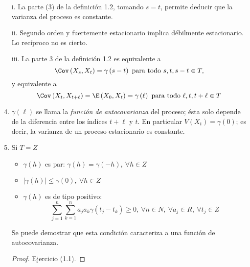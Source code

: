 \begin{observacion}
\quad
\begin{enumerate}
\item[i.] La parte (3) de la definici\'{o}n 1.2, tomando $s=t$, permite deducir que la varianza del proceso es constante.
\item[ii.] Segundo orden y fuertemente estacionario implica d\'{e}bilmente estacionario. Lo rec\'{i}proco no es cierto.
\item[iii.] La parte 3 de la definici\'{o}n 1.2 es equivalente a
\[ 
\Cov\left( X_{s},X_{t} \right)=\gamma \left( s-t \right)\text{ para todo } s,t,s-t\in T,
\]
y equivalente a
\[
\Cov\left( X_{t}, X_{t+\ell} \right)=\E\left( X_{0}, X_{t} \right)=\gamma \left(\ell \right)\text{ para todo }  \ell, t, t+\ell \in T
\]

\item $\gamma \left( \ell \right)$ se llama la \emph{funci\'{o}n de autocovarianza} del proceso; \'{e}sta solo depende de la diferencia entre los \'{i}ndices $t+\ell$ y $t$. En particular $V\left( X_{t} \right)=\gamma (0)$; es decir, la varianza de un proceso estacionario es constante.

\item Si $T=Z$
  \begin{itemize}
  \item $\gamma \left( h \right)$ es par: $\gamma \left( h \right)=\gamma \left( -h \right),\  \forall   h\in Z$
  \item $\left| \gamma \left( h \right) \right|\le \gamma \left( 0 \right),\  \forall h\in Z$ 
  \item $\gamma \left( h \right)$ es de tipo positivo:
  \[
    \sum_{j=1}^n \sum_{k=1}^n {a_{j}a_{k}\gamma \left( t_{j}-t_{k} 
    \right)} \geq 0,
    \ \forall n\in N,\ \forall a_{j}\in R,\ \forall t_{j}\in Z
  \]
  \end{itemize}
Se puede demostrar que esta condici\'{o}n caracteriza a una funci\'{o}n de autocovarianza.

\begin{proof}
 Ejercicio (1.1).\qedhere
\end{proof}
\end{enumerate}
\end{observacion}

